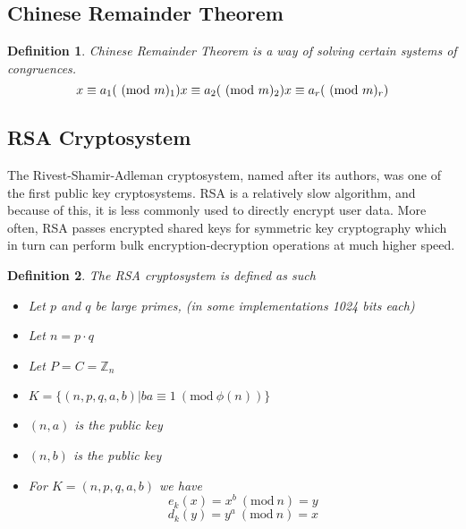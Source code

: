 \documentclass{article}
\theoremstyle{quest}
\newtheorem*{definition}{Definition}
\newcommand{\Z}{\mathbb{Z}}
\newcommand{\Mod}[1]{\ (\mathrm{mod}\ #1)}
\begin{document}
\subsection{Chinese Remainder Theorem}
\begin{definition}
    \textit{Chinese Remainder Theorem} is a way of solving certain systems of congruences.
    $$
    x \equiv a_1 (\Mod m_1) \\
    x \equiv a_2 (\Mod m_2) \\
    x \equiv a_r (\Mod m_r)
    $$
\end{definition}

\subsection{RSA Cryptosystem}
The Rivest-Shamir-Adleman cryptosystem,
named after its authors, was one of the first public key cryptosystems.
RSA is a relatively slow algorithm, and because of this,
it is less commonly used to directly encrypt user data.
More often, RSA passes encrypted shared keys for symmetric key cryptography
which in turn can perform bulk encryption-decryption operations at much higher speed.

\begin{definition}
    The \textit{RSA cryptosystem} is defined as such
    \begin{itemize}
        \item Let $p$ and $q$ be large primes, (in some implementations 1024 bits each)
        \item Let $n = p \cdot q$
        \item Let $P = C = \Z_n$
        \item $K = \{(n,p,q,a,b) | ba \equiv 1 \Mod{\phi(n)}\}$
        \item $(n,a)$ is the public key
        \item $(n,b)$ is the public key
        \item For $K = (n,p,q,a,b)$ we have
            $$e_k(x) = x^b \Mod n = y$$
            $$d_k(y) = y^a \Mod n = x$$
    \end{itemize}
\end{definition}
\end{document}
